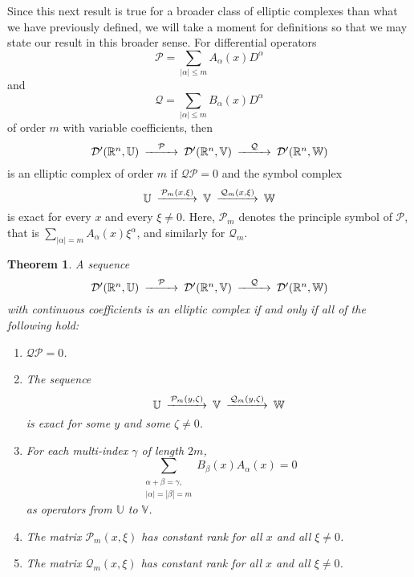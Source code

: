 \documentclass{amsart}
\newtheorem{theorem}{Theorem}[section]
\theoremstyle{definition}
\numberwithin{equation}{section}
\begin{document}
Since this next result is true for a broader class of elliptic complexes than what we have previously defined, we will take a moment for definitions so that we may state our result in this broader sense.  For differential operators $${\mathcal{P}} = \sum_{{\left\vert{\alpha}\right\vert} \leq m} A_{\alpha}(x) D^{\alpha}$$ and $${\mathcal{Q}} = \sum_{{\left\vert{\alpha}\right\vert} \leq m} B_{\alpha}(x) D^{\alpha}$$ of order $m$ with variable coefficients, then $$\begin{CD} {\mathcal{D}}'(\Bbb R^n, {\mathbb{U}}) @>{\mathcal{P}}>> {\mathcal{D}}'(\Bbb R^n, {\mathbb{V}}) @>{\mathcal{Q}}>> {\mathcal{D}}'(\Bbb R^n, {\mathbb{W}}) \end{CD}$$ is an elliptic complex of order $m$ if ${\mathcal{Q}}{\mathcal{P}}=0$ and the symbol complex $$\begin{CD} {\mathbb{U}} @>{\mathcal{P}}_m(x,\xi)>> {\mathbb{V}} @>{\mathcal{Q}}_m(x,\xi)>> {\mathbb{W}} \end{CD}$$ is exact for every $x$ and every $\xi \neq 0$.  Here, ${\mathcal{P}}_m$ denotes the principle symbol of ${\mathcal{P}}$, that is $\sum_{{\left\vert{\alpha}\right\vert}=m} A_{\alpha}(x) \xi^{\alpha}$, and similarly for ${\mathcal{Q}}_m$.

\begin{theorem}
A sequence $$\begin{CD} {\mathcal{D}}'(\Bbb R^n, {\mathbb{U}}) @>{\mathcal{P}}>> {\mathcal{D}}'(\Bbb R^n, {\mathbb{V}}) @>{\mathcal{Q}}>> {\mathcal{D}}'(\Bbb R^n, {\mathbb{W}})\end{CD}$$ with continuous coefficients is an elliptic complex if and only if all of the following hold:

\begin{enumerate}
\item ${\mathcal{Q}}{\mathcal{P}}=0$.
\item The sequence $$\begin{CD} {\mathbb{U}} @>{\mathcal{P}}_m(y,{\zeta})>> {\mathbb{V}} @>{\mathcal{Q}}_m(y,{\zeta})>> {\mathbb{W}} \end{CD}$$ is exact for some $y$ and some ${\zeta}\neq0$.
\item For each multi-index ${\gamma}$ of length $2m$, $$\sum_{\substack{{\alpha}+{\beta}={\gamma}, \\ {\left\vert{\alpha}\right\vert} = {\left\vert{\beta}\right\vert} =m}} B_{\beta}(x) A_{\alpha}(x) =0$$ as operators from ${\mathbb{U}}$ to ${\mathbb{V}}$.
\item The matrix ${\mathcal{P}}_m(x,\xi)$ has constant rank for all $x$ and all $\xi\neq0$.
\item The matrix ${\mathcal{Q}}_m(x,\xi)$ has constant rank for all $x$ and all $\xi\neq0$.
\end{enumerate}
\end{theorem}
\end{document}
